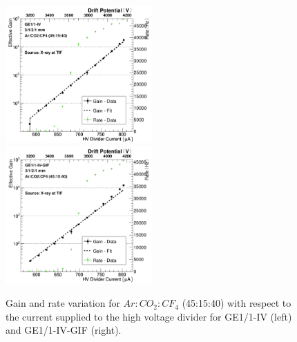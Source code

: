 \begin{figure}[htbp]
    \centering
    \includegraphics[width=0.5\textwidth]{figures/GEM/Gain_curve_GE11_IV_Ar_CO2_CF4.jpeg}%
    \includegraphics[width=0.5\textwidth]{figures/GEM/Gain_curve_GE11_IV_GIF_Ar_CO2_CF4.jpeg}
    \caption{Gain and rate variation for $Ar:CO_2:CF_4$ (45:15:40) with respect to the current supplied to the high voltage divider for GE1/1-IV (left) and GE1/1-IV-GIF (right).}
    \label{fig:gain_GE1/1_IV_GIF}
\end{figure}





